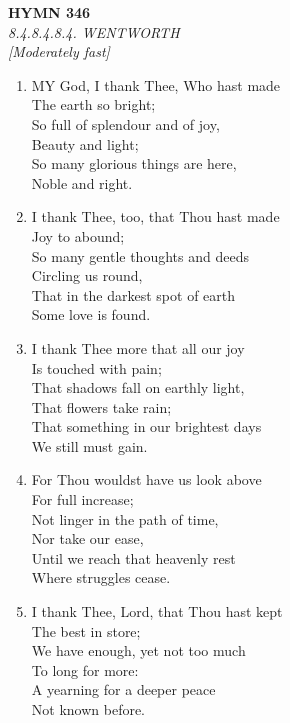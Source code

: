 \newpage
\begin{center}
    {\Large \textbf{HYMN 346}}
    \\
    \textit{8.4.8.4.8.4. WENTWORTH}
    \\
    \textit{\small [Moderately fast]}
\end{center}
\vspace{1em}

\begin{enumerate}
    \item MY God, I thank Thee, Who hast made \\
        The earth so bright; \\
        So full of splendour and of joy, \\
        Beauty and light; \\
        So many glorious things are here, \\
        Noble and right.

    \item I thank Thee, too, that Thou hast made \\
        Joy to abound; \\
        So many gentle thoughts and deeds \\
        Circling us round, \\
        That in the darkest spot of earth \\
        Some love is found.

    \item I thank Thee more that all our joy \\
        Is touched with pain; \\
        That shadows fall on earthly light, \\
        That flowers take rain; \\
        That something in our brightest days \\
        We still must gain.

    \item For Thou wouldst have us look above \\
        For full increase; \\
        Not linger in the path of time, \\
        Nor take our ease, \\
        Until we reach that heavenly rest \\
        Where struggles cease.

    \item I thank Thee, Lord, that Thou hast kept \\
        The best in store; \\
        We have enough, yet not too much \\
        To long for more: \\
        A yearning for a deeper peace \\
        Not known before.

\end{enumerate}

